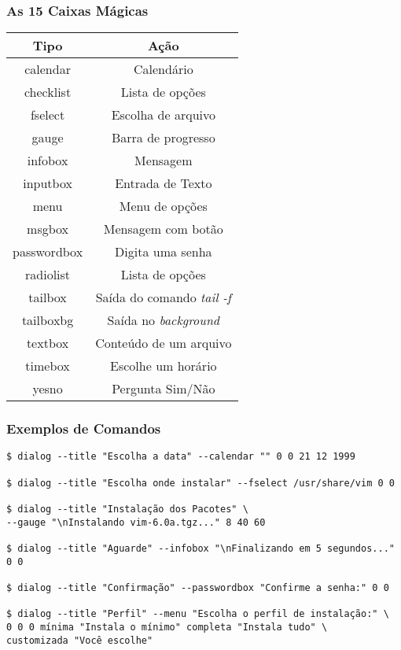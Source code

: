 \documentclass{beamer}
\begin{document}
   \begin{frame}
      \frametitle{As 15 Caixas Mágicas}
      \scriptsize
      \begin{table}
         \begin{tabular}{c|c}
         \textbf{Tipo} & \textbf{Ação} \\
	 \hline
	 calendar & Calendário \\
         \hline 
 	 checklist & Lista de opções \\
         \hline 
 	 fselect & Escolha de arquivo \\
         \hline 
 	 gauge & Barra de progresso \\
         \hline 
 	 infobox & Mensagem \\
         \hline 
 	 inputbox & Entrada de Texto \\
         \hline 
 	 menu & Menu de opções \\
         \hline 
 	 msgbox & Mensagem com botão \\
         \hline 
 	 passwordbox & Digita uma senha \\
         \hline 
 	 radiolist & Lista de opções \\
         \hline 
 	 tailbox & Saída do comando \textit{tail -f} \\
         \hline 
 	 tailboxbg & Saída no \textit{background} \\
         \hline 
 	 textbox & Conteúdo de um arquivo \\
         \hline 
 	 timebox & Escolhe um horário \\
         \hline 
 	 yesno & Pergunta Sim/Não \\
         \hline 
       \end{tabular}
      \end{table}
   \end{frame}


   \begin{frame}[fragile]
      \frametitle{Exemplos de Comandos}
      \scriptsize
      \begin{verbatim}
$ dialog --title "Escolha a data" --calendar "" 0 0 21 12 1999
      
$ dialog --title "Escolha onde instalar" --fselect /usr/share/vim 0 0 

$ dialog --title "Instalação dos Pacotes" \ 
--gauge "\nInstalando vim-6.0a.tgz..." 8 40 60

$ dialog --title "Aguarde" --infobox "\nFinalizando em 5 segundos..." 0 0 

$ dialog --title "Confirmação" --passwordbox "Confirme a senha:" 0 0 

$ dialog --title "Perfil" --menu "Escolha o perfil de instalação:" \ 
0 0 0 mínima "Instala o mínimo" completa "Instala tudo" \ 
customizada "Você escolhe"
      \end{verbatim}
\end{frame}
\end{document}
